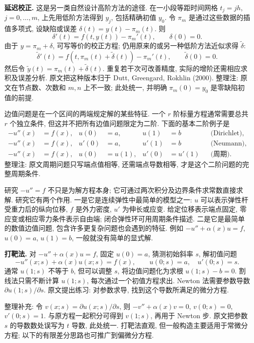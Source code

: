 \textbf{延迟校正.} 这是另一类自然设计高阶方法的途径. 在一小段等距时间网格 $t_j=jh$, $j=0,\ldots,m$, 上先用低阶方法得到 $y_j$, 包括精确初值 $y_0$. 令 $\pi_m$ 是通过这些数据的插值多项式, 设缺陷或误差 $\delta(t)=y(t)-\pi_m(t)$. 则
\[
\delta'(t)=f(t,y(t))-\pi_m'(t),\qquad\delta(0)=0.
\]
由于 $y=\pi_m+\delta$, 可写等价的校正方程; 仍用原来的或另一种低阶方法近似求得 $\widetilde\delta$:
\[
\widetilde\delta'(t)=f(t,\pi_m(t)+\widetilde\delta(t))-\pi_m'(t),
\qquad\widetilde\delta(0)=0.
\]
然后令 $\widetilde y(t)=\pi_m(t)+\widetilde\delta(t)$. 重复若干次可改善精度, 实际的增阶还需相应求积及误差分析. 原文把这种版本归于 Dutt, Greengard, Rokhlin (2000). 整理注: 原文在节点数、次数和 $m,n$ 上不一致; 此处统一, 并明确 $\pi_m(0)=y_0$ 是零缺陷初值的前提.


边值问题是在一个区间的两端规定解的某些特征. 一个 $r$ 阶标量方程通常需要总共 $r$ 个独立条件, 但这并不把所有边值问题限定为二阶. 下面的基本二阶例子是
\begin{align*}
-u''(x)&=f(x),&u(0)&=a,&u(1)&=b&&\text{(Dirichlet)},\\
-u''(x)&=f(x),&u'(0)&=a,&u'(1)&=b&&\text{(Neumann)},\\
-u''(x)&=f(x),&u(0)&=u(1),&u'(0)&=u'(1)&&\text{(周期)}.
\end{align*}
整理注: 原文周期问题只写端点值相等, 还需端点导数相等, 才是这个二阶问题的完整周期条件.

研究 $-u''=f$ 不只是为解方程本身; 它可通过两次积分及边界条件求常数直接求解. 研究它有两个作用. 一是它是连续弹性中最简单的模型之一: $u$ 可以表示弹性杆受重力后的纵向位移, $f$ 是外力密度, $u'$ 为伸长或应变. 给定位移表示端点固定, 零应变或相应零力条件表示自由端; 闭合弹性环可用周期条件描述. 二是它是最简单的数值边值问题, 包含许多更复杂问题也会遇到的特征. 例如 $-u''+\alpha(x)u=f$, $u(0)=a$, $u(1)=b$, 一般就没有简单的显式解.

\textbf{打靶法.} 对 $-u''+\alpha(x)u=f$, 固定 $u(0)=a$, 猜测初始斜率 $s$, 解初值问题
\[
-u''(x;s)+\alpha(x)u(x;s)=f(x),\qquad u(0;s)=a,\quad u'(0;s)=s.
\]
通常 $u(1;s)$ 不等于 $b$, 但可以调整 $s$, 将边值问题化为求根 $u(1;s)-b=0$. 割线法只需不断计算 $u(1;s)$, 每次通过一个初值方程求出. Newton 法需要参数导数 $\partial u(1;s)/\partial s$. 原文提出练习: 对参数求导, 找到这个导数所满足的微分方程.

整理补充: 令 $v(x;s)=\partial u(x;s)/\partial s$, 则 $-v''+\alpha(x)v=0$, $v(0;s)=0$, $v'(0;s)=1$. 与原方程一起积分可得到 $v(1;s)$, 再用于 Newton 步. 原文把参数 $s$ 的导数数处误写为 $t$ 导数, 此处统一. 打靶法直观, 但一般构造主要适用于常微分方程; 以下的有限差分思路也可推广到偏微分方程.

